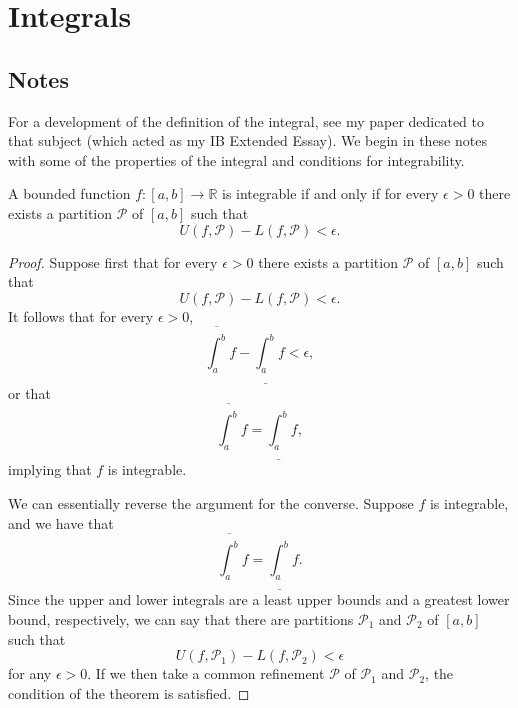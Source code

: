 \section{Integrals}

\subsection{Notes}
For a development of the definition of the integral, see my paper dedicated to that subject (which acted as my IB Extended Essay). We begin in these notes with some of the properties of the integral and conditions for integrability. 

\begin{theorem} \label{fintegiffuleps}
A bounded function $f: [a, b] \to \mathbb{R}$ is integrable if and only if for every $\epsilon > 0$ there exists a partition $\mathscr{P}$ of $[a, b]$ such that 
\[ U(f, \mathscr{P}) - L(f, \mathscr{P}) < \epsilon. \]
\begin{proof}
Suppose first that for every $\epsilon > 0$ there exists a partition $\mathscr{P}$ of $[a, b]$ such that 
\[ U(f, \mathscr{P}) - L(f, \mathscr{P}) < \epsilon. \]
It follows that for every $\epsilon > 0$,
\[ \overline{\int_a^b} f - \underline{\int_a^b} f < \epsilon, \]
or that
\[ \overline{\int_a^b} f = \underline{\int_a^b} f, \]
implying that $f$ is integrable.

We can essentially reverse the argument for the converse. Suppose $f$ is integrable, and we have that
\[ \overline{\int_a^b} f = \underline{\int_a^b} f. \]
Since the upper and lower integrals are a least upper bounds and a greatest lower bound, respectively, we can say that there are partitions $\mathscr{P}_1$ and $\mathscr{P}_2$ of $[a, b]$ such that 
\[ U(f, \mathscr{P}_1) - L(f, \mathscr{P}_2) < \epsilon \]
for any $\epsilon > 0$. If we then take a common refinement $\mathscr{P}$ of $\mathscr{P}_1$ and $\mathscr{P}_2$, the condition of the theorem is satisfied.
\end{proof}
\end{theorem}

